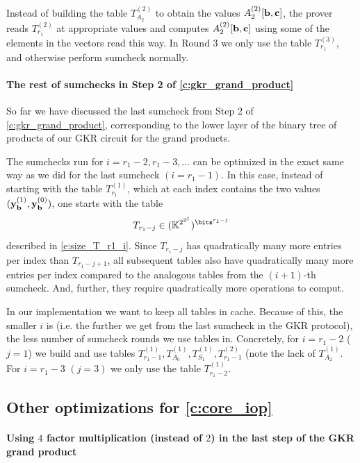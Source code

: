 \documentclass[11pt,letterpaper,usenames,dvipsnames]{article}
\begin{document}
 Instead of building the table $T_{A_2}^{(2)}$ to obtain the values $A_2^{(2)}[\mathbf{b},\mathbf{c}]$, the prover  reads  $T_{r_1}^{(2)}$  at appropriate values and computes $A_2^{(2)}[\mathbf{b},\mathbf{c}]$ using some of the elements in the vectors read this way.  In  Round 3 we only use the table $T_{r_1}^{(3)}$, and otherwise perform sumcheck normally. 


\paragraph{The rest of sumchecks in Step 2 of \cref{c:gkr_grand_product}} So far we have discussed the last sumcheck from Step 2 of \cref{c:gkr_grand_product}, corresponding to the lower layer of the binary tree of products of our GKR circuit for the grand products. 

The sumchecks run for $i=r_1-2, r_1-3,\ldots$ can be optimized in the exact same way as we did for the last sumcheck $(i=r_1-1)$. In this case, instead of starting with the table $T_{r_1}^{(1)}$, which at each index contains the two values $(\mathbf{y}_{\mathbf{b}}^{(1)}, \mathbf{y}_{\mathbf{b}}^{(0)})$, one starts with the table
%
$$
T_{r_1-j} \in (\KK^{2^{2^{j}}})^{\bits^{r_1-j}}
$$
described in \cref{e:size_T_r1_i}. Since $T_{r_1-j}$ has quadratically many  more entries per index than $T_{r_1-j+1}$, all subsequent tables also have quadratically many more entries per index compared to the analogous tables from the $(i+1)$-th sumcheck. And, further, they require quadratically more operations to comput.

In our implementation we want to keep all tables in cache. Because of this, the smaller $i$ is (i.e. the further we get from the last sumcheck in the GKR protocol), the less number of sumcheck rounds we use tables in. Concretely, for $i=r_1-2$ ($j=1$) we build and use tables $T_{r_1-1}^{(1)}, T_{A_0}^{(1)}, T_{S_1}^{(1)},  T_{r_1-1}^{(2)}$ (note the lack of $T_{A_2}^{(1)}$. For $i=r_1-3$ $(j=3)$ we only use the table $T_{r_1-2}^{(1)}$.




\subsection{Other optimizations for \cref{c:core_iop}}

\paragraph{Using $4$ factor multiplication (instead of $2$) in the last step of the GKR grand product}
\end{document}

